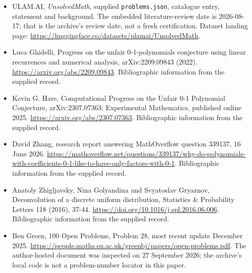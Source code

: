 \documentclass[11pt,a4paper]{article}
\begin{document}
{\small

\begin{itemize}

\item[\hypertarget{source:statement:1}{S1}] ULAM.AI, \emph{UnsolvedMath}, supplied \texttt{problems.json}, catalogue entry, statement and background. The embedded literature-review date is 2026-08-17; that is the archive’s review date, not a fresh certification. Dataset landing page: \url{https://huggingface.co/datasets/ulamai/UnsolvedMath}.

\item[\hypertarget{source:statement:2}{S2}] Luca Ghidelli, Progress on the unfair 0-1-polynomials conjecture using linear recurrences and numerical analysis, arXiv:2209.09843 (2022). \url{https://arxiv.org/abs/2209.09843}. Bibliographic information from the supplied record.

\item[\hypertarget{source:statement:3}{S3}] Kevin G. Hare, Computational Progress on the Unfair 0-1 Polynomial Conjecture, arXiv:2307.07363; Experimental Mathematics, published online 2025. \url{https://arxiv.org/abs/2307.07363}. Bibliographic information from the supplied record.

\item[\hypertarget{source:statement:4}{S4}] David Zhang, research report answering MathOverflow question 339137, 16 June 2026. \url{https://mathoverflow.net/questions/339137/why-do-polynomials-with-coefficients-0-1-like-to-have-only-factors-with-0-1}. Bibliographic information from the supplied record.

\item[\hypertarget{source:statement:5}{S5}] Anatoly Zhigljavsky, Nina Golyandina and Svyatoslav Gryaznov, Deconvolution of a discrete uniform distribution, Statistics \& Probability Letters 118 (2016), 37-44. \url{https://doi.org/10.1016/j.spl.2016.06.006}. Bibliographic information from the supplied record.

\item[\hypertarget{source:statement:6}{S6}] Ben Green, 100 Open Problems, Problem 28, most recent update December 2025. \url{https://people.maths.ox.ac.uk/greenbj/papers/open-problems.pdf}. The author-hosted document was inspected on 27 September 2026; the archive’s local code is not a problem-number locator in this paper.

\end{itemize}

}

\label{end:statement}
\end{document}
